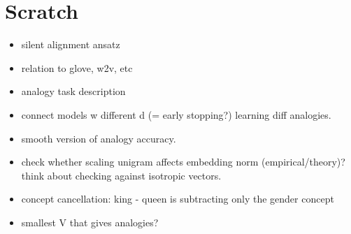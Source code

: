 \section{Scratch}

\begin{itemize}
    \item silent alignment ansatz
    \item relation to glove, w2v, etc
    \item analogy task description
    \item connect models w different d (= early stopping?) learning diff analogies.
    \item smooth version of analogy accuracy.
    \item check whether scaling unigram affects embedding norm (empirical/theory)? think about checking against isotropic vectors.
    \item concept cancellation: king - queen is subtracting only the gender concept
    \item smallest V that gives analogies?
\end{itemize}